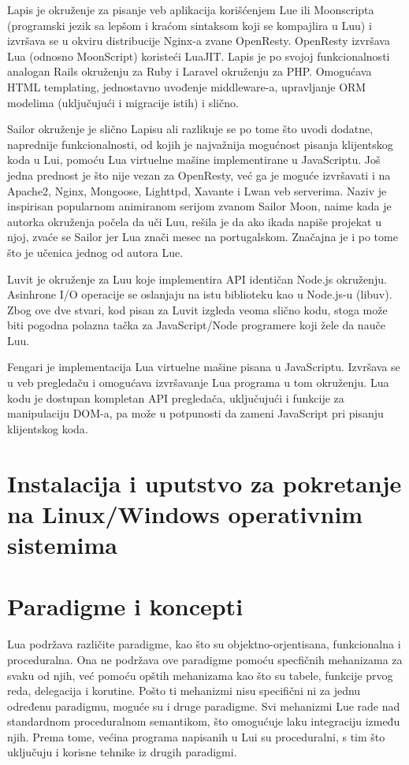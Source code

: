 \documentclass[a4paper]{article}
\begin{document}
Lapis je okruženje za pisanje veb aplikacija korišćenjem Lue ili Moonscripta (programski jezik sa lepšom i kraćom sintaksom koji se kompajlira u Luu) i izvršava se u okviru distribucije Nginx-a zvane OpenResty. OpenResty izvršava Lua (odnosno MoonScript) koristeći LuaJIT. Lapis je po svojoj funkcionalnosti analogan Rails okruženju za Ruby i Laravel okruženju za PHP. Omogućava HTML templating, jednostavno uvođenje middleware-a, upravljanje ORM modelima (uključujući i migracije istih) i slično. 

Sailor okruženje je slično Lapisu ali razlikuje se po tome što uvodi dodatne, naprednije funkcionalnosti, od kojih je najvažnija mogućnost pisanja klijentskog koda u Lui, pomoću Lua virtuelne mašine implementirane u JavaScriptu. Još jedna prednost je što nije vezan za OpenResty, već ga je moguće izvršavati i na Apache2, Nginx, Mongoose, Lighttpd, Xavante i Lwan veb serverima. Naziv je inspirisan popularnom animiranom serijom zvanom Sailor Moon, naime kada je autorka okruženja počela da uči Luu, rešila je da ako ikada napiše projekat u njoj, zvaće se Sailor jer Lua znači mesec na portugalskom. Značajna je i po tome što je učenica jednog od autora Lue\cite{frameworkSailor}.

Luvit je okruženje za Luu koje implementira API identičan Node.js okruženju. Asinhrone I/O operacije se oslanjaju na istu biblioteku kao u Node.js-u (libuv). Zbog ove dve stvari, kod pisan za Luvit izgleda veoma slično kodu, stoga može biti pogodna polazna tačka za JavaScript/Node programere koji žele da nauče Luu.

Fengari je implementacija Lua virtuelne mašine pisana u JavaScriptu. Izvršava se u veb pregledaču i omogućava izvršavanje Lua programa u tom okruženju. Lua kodu je dostupan kompletan API pregledača, uključujući i funkcije za manipulaciju DOM-a, pa može u potpunosti da zameni JavaScript pri pisanju klijentskog koda\cite{frameworkFengari}.


\section{Instalacija i uputstvo za pokretanje na Linux/Windows operativnim sistemima}
\label{sec:instalacija}


\section{Paradigme i koncepti}
\label{sec:paradigme_koncepti}

Lua podržava različite paradigme, kao što su objektno-orjentisana, funkcionalna i proceduralna. Ona ne podržava ove paradigme pomoću specfičnih mehanizama za svaku od njih, već pomoću opštih mehanizama kao što su tabele, funkcije prvog reda, delegacija i korutine. Pošto ti mehanizmi nisu specifični ni za jednu određenu paradigmu, moguće su i druge paradigme. Svi mehanizmi Lue rade nad standardnom proceduralnom semantikom, što omogućuje laku integraciju između njih. Prema tome, većina programa napisanih u Lui su proceduralni, s tim što uključuju i korisne tehnike iz drugih paradigmi. \cite{multiParadigms}
\end{document}
